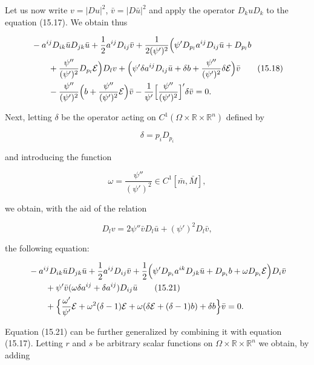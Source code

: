 Let us now write $v=|Du|^2$, $\bar v=|D\bar u|^2$ and apply the operator $D_k u D_k$ to the equation
(15.17). We obtain thus

\begin{align}
&-a^{ij}D_{ik}\bar u D_{jk}\bar u+\frac12 a^{ij}D_{ij}\bar v+\frac{1}{2(\psi')^2}\Bigl(\psi' D_{p_l}a^{ij}D_{ij}\bar u+D_{p_l}b
\notag\\
&\qquad+\frac{\psi''}{(\psi')^2}D_{p_l}\mathcal E\Bigr)D_l v+\Bigl(\psi' \delta a^{ij}D_{ij}\bar u+\delta b+\frac{\psi''}{(\psi')^2}\delta \mathcal E\Bigr)\bar v
\tag{15.18}\\
&\qquad-\frac{\psi''}{(\psi')^2}\Bigl(b+\frac{\psi''}{(\psi')^2}\mathcal E\Bigr)\bar v-\frac{1}{\psi'}\Bigl[\frac{\psi''}{(\psi')^2}\Bigr]'\delta \bar v=0.
\notag
\end{align}

Next, letting $\delta$ be the operator acting on $C^1(\Omega\times \mathbb R\times \mathbb R^n)$ defined by

\begin{equation}
\delta=p_iD_{p_i}
\tag{15.19}
\end{equation}

and introducing the function

\begin{equation}
\omega=\frac{\psi''}{(\psi')^2}\in C^1[\bar m,\bar M],
\tag{15.20}
\end{equation}

we obtain, with the aid of the relation

\[
D_l v=2\psi''\bar v D_l\bar u+(\psi')^2D_l\bar v,
\]

the following equation:

\begin{align}
&-a^{ij}D_{ik}\bar u D_{jk}\bar u+\frac12 a^{ij}D_{ij}\bar v+\frac12\Bigl(\psi' D_{p_i}a^{ik}D_{jk}\bar u+D_{p_i}b+\omega D_{p_i}\mathcal E\Bigr)D_i \bar v
\notag\\
&\qquad+\psi'\bar v(\omega \delta a^{ij}+\delta a^{ij})D_{ij}\bar u
\tag{15.21}\\
&\qquad+\Bigl\{\frac{\omega'}{\psi'}\mathcal E+\omega^2(\delta-1)\mathcal E+\omega(\delta \mathcal E+(\delta-1)b)+\delta b\Bigr\}\bar v=0.
\notag
\end{align}

Equation (15.21) can be further generalized by combining it with equation (15.17).
Letting $r$ and $s$ be arbitrary scalar functions on $\Omega\times \mathbb R\times \mathbb R^n$ we obtain, by adding


\pagestyle{empty}


